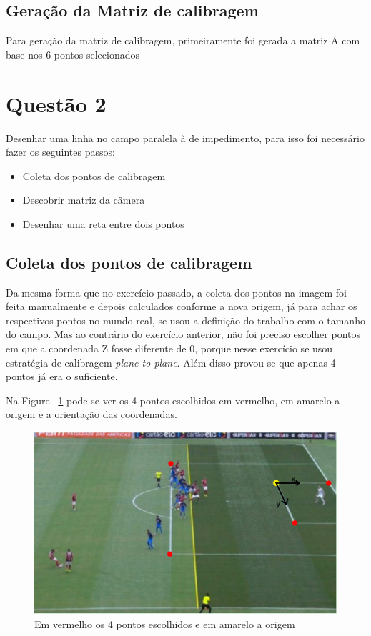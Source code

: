 \documentclass{article}
\begin{document}
    \subsection{Geração da Matriz de calibragem}
    Para geração da matriz de calibragem, primeiramente foi gerada a matriz A com base nos 6 pontos selecionados

\section{Questão 2}
    Desenhar uma linha no campo paralela à de impedimento, para isso foi necessário fazer os seguintes passos:
   \begin{itemize}
       \item Coleta dos pontos de calibragem
       \item Descobrir matriz da câmera
       \item Desenhar uma reta entre dois pontos
   \end{itemize}

    \subsection{Coleta dos pontos de calibragem}
    Da mesma forma que no exercício passado, a coleta dos pontos na imagem foi feita manualmente e depois calculados conforme a nova origem, já para achar os respectivos pontos no mundo real, se usou a definição do trabalho com o tamanho do campo. Mas ao contrário do exercício anterior, não foi preciso escolher pontos em que a coordenada Z fosse diferente de 0, porque nesse exercício se usou estratégia de calibragem \textit{plane to plane}. Além disso provou-se que apenas 4 pontos já era o suficiente.
    
    Na Figure ~\ref{fig:maracana2Pontos} pode-se ver os 4 pontos escolhidos em vermelho, em amarelo a origem e a orientação das coordenadas.
        \begin{figure}[h!]
        \includegraphics[scale=0.6]{maracana2Pontos.PNG}
        \caption{Em vermelho os 4 pontos escolhidos e em amarelo a origem}
        \label{fig:maracana2Pontos}
        \end{figure}
        
\end{document}
